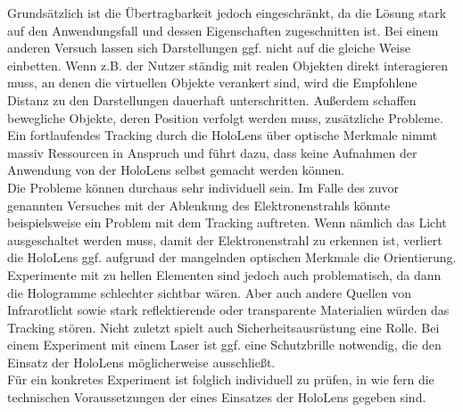 Grundsätzlich ist die Übertragbarkeit jedoch eingeschränkt, da die Lösung stark auf den Anwendungsfall und dessen Eigenschaften zugeschnitten ist. Bei einem anderen Versuch lassen sich Darstellungen ggf. nicht auf die gleiche Weise einbetten. Wenn z.B. der Nutzer ständig mit realen Objekten direkt interagieren muss, an denen die virtuellen Objekte verankert sind, wird die Empfohlene Distanz zu den Darstellungen dauerhaft unterschritten. Außerdem schaffen bewegliche Objekte, deren Position verfolgt werden muss, zusätzliche Probleme. Ein fortlaufendes Tracking durch die HoloLens über optische Merkmale nimmt massiv Ressourcen in Anspruch und führt dazu, dass keine Aufnahmen der Anwendung von der HoloLens selbst gemacht werden können.\\

Die Probleme können durchaus sehr individuell sein. Im Falle des zuvor genannten Versuches mit der Ablenkung des Elektronenstrahls könnte beispielsweise ein Problem mit dem Tracking auftreten. Wenn nämlich das Licht ausgeschaltet werden muss, damit der Elektronenstrahl zu erkennen ist, verliert die HoloLens ggf. aufgrund der mangelnden optischen Merkmale die Orientierung. Experimente mit zu hellen Elementen sind jedoch auch problematisch, da dann die Hologramme schlechter sichtbar wären. Aber auch andere Quellen von Infrarotlicht sowie stark reflektierende oder transparente Materialien würden das Tracking stören. Nicht zuletzt spielt auch Sicherheitsausrüstung eine Rolle. Bei einem Experiment mit einem Laser ist ggf. eine Schutzbrille notwendig, die den Einsatz der HoloLens möglicherweise ausschließt.\\

Für ein konkretes Experiment ist folglich individuell zu prüfen, in wie fern die technischen Voraussetzungen der eines Einsatzes der HoloLens gegeben sind.
	
	
	
	
	
	
	
	
	
	
	